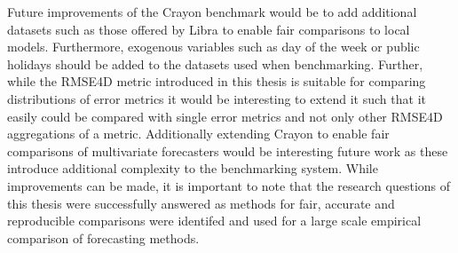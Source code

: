 Future improvements of the Crayon benchmark would be to add additional datasets such as those offered by Libra to enable fair comparisons to local models. Furthermore, exogenous variables such as day of the week or public holidays should be added to the datasets used when benchmarking. Further, while the RMSE4D metric introduced in this thesis is suitable for comparing distributions of error metrics it would be interesting to extend it such that it easily could be compared with single error metrics and not only other RMSE4D aggregations of a metric. Additionally extending Crayon to enable fair comparisons of multivariate forecasters would be interesting future work as these introduce additional complexity to the benchmarking system. While improvements can be made, it is important to note that the research questions of this thesis were successfully answered as methods for fair, accurate and reproducible comparisons were identifed and used for a large scale empirical comparison of forecasting methods.
